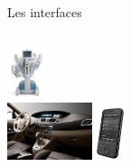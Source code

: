 \begin{frame}{Les interfaces}
\begin{columns}
\begin{column}[l]{5cm}
      \includegraphics[height = 1.5cm]{img/s01/Davinci-Robot-chirurgical-001.jpg}\\
      \includegraphics[width =
      2.5cm]{img/s01/scenic_console_centrale.png}\hspace{1cm}
      \includegraphics[height = 1.5cm]{img/s01/telephone_tc_linux.png}
    \end{column}
  \end{columns}
\end{frame}

